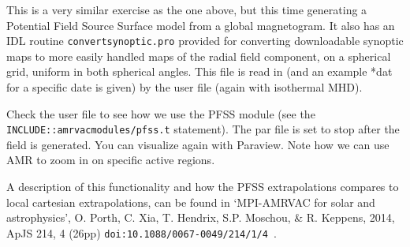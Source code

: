 \documentclass[10pt]{article}
\begin{document}
This is a very similar exercise as the one above, but this time generating a Potential Field Source Surface model from a global magnetogram. It also has an IDL routine {\tt convertsynoptic.pro} provided for converting downloadable synoptic maps to more easily handled maps of the radial field component, on a spherical grid, uniform in both spherical angles. This file is read in (and an example *dat for a specific date is given) by the user file (again with isothermal MHD).

Check the user file to see how we use the PFSS module (see the {\tt INCLUDE::amrvacmodules/pfss.t} statement). The par file is set to stop after the field is generated. You can visualize again with Paraview. Note how we can use AMR to zoom in on specific active regions.

A description of this functionality and how the PFSS extrapolations compares to local cartesian extrapolations, can be found in
`MPI-AMRVAC for solar and astrophysics', O. Porth, C. Xia, T. Hendrix, S.P. Moschou, \& R. Keppens, 2014, ApJS 214, 4 (26pp) {\tt doi:10.1088/0067-0049/214/1/4 }.
\end{document}
